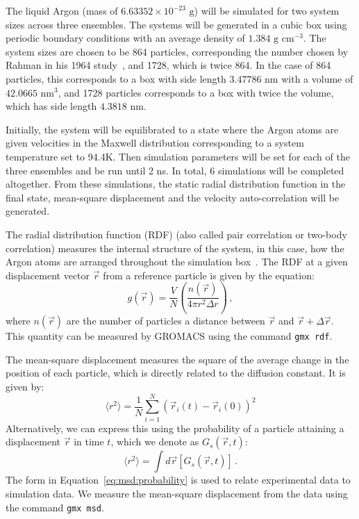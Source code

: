 \documentclass[12pt]{article}
\newcommand{\code}[1]{\lstinline{#1}}
\begin{document}
The liquid Argon (mass of $6.63352\times 10^{-23}\text{ g}$) will be simulated for two system sizes across three ensembles. The systems will be generated in a cubic box using periodic boundary conditions with an average density of $1.384 \text{ g cm}^{-3}$. 
The system sizes are chosen to be 864 particles, corresponding the number chosen by Rahman in his 1964 study~\cite{Rahman1964}, and 1728, which is twice 864. In the case of 864 particles, this corresponds to a box with side length $3.47786\text{ nm}$ with a volume of $42.0665\text{ nm}^3$, and 1728 particles corresponds to a box with twice the volume, which has side length $4.3818\text{ nm}$.

Initially, the system will be equilibrated to a state where the Argon atoms are given velocities in the Maxwell distribution corresponding to a system temperature set to 94.4K. Then simulation parameters will be set for each of the three ensembles and be run until 2 ns. In total, 6 simulations will be completed altogether. From these simulations, the static radial distribution function in the final state, mean-square displacement and the velocity auto-correlation will be generated. 

The radial distribution function (RDF) (also called pair correlation or two-body correlation) measures the internal structure of the system, in this case, how the Argon atoms are arranged throughout the simulation box~\cite{Altland_2010}. The RDF at a given displacement vector $\vec{r}$ from a reference particle is given by the equation:
\begin{equation}
	g(\vec{r}) = \frac{V}{N}\left(\frac{n(\vec{r})}{4\pi r^2 \Delta r}\right)\,,
\end{equation}
where $n(\vec{r})$ are the number of particles a distance between $\vec{r}$ and $\vec{r} + \Delta \vec{r}$. This quantity can be measured by GROMACS using the command \code{gmx rdf}.

The mean-square displacement measures the square of the average change in the position of each particle, which is directly related to the diffusion constant. It is given by:
\begin{equation}
	\langle r^2 \rangle = \frac{1}{N}\sum_{i = 1}^N (\vec{r}_i(t) - \vec{r}_i(0))^2
\end{equation}
Alternatively, we can express this using the probability of a particle attaining a displacement $\vec{r}$ in time $t$, which we denote as $G_s(\vec{r}, t)$:
\begin{equation}
	\langle r^2 \rangle = \int d\vec{r}\left[G_s(\vec{r}, t)\right]\,.\label{eq:msd:probability}
\end{equation}
The form in Equation~\ref{eq:msd:probability} is used to relate experimental data to simulation data.
We measure the mean-square displacement from the data using the command \code{gmx msd}.
\end{document}
